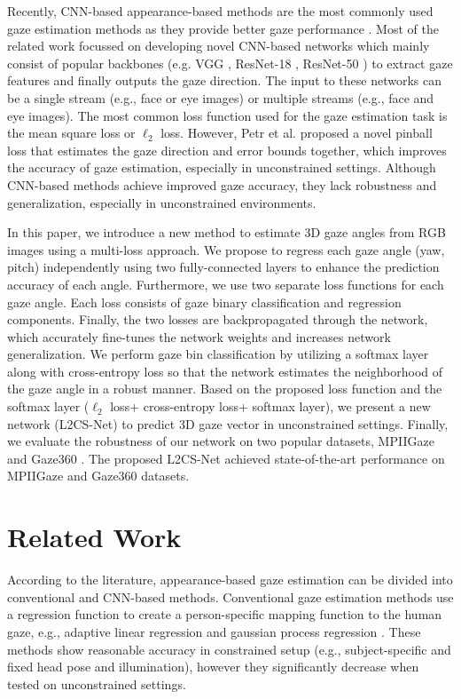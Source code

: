 \documentclass{article}
\begin{document}
Recently, CNN-based appearance-based methods are the most commonly used gaze estimation methods as they provide better gaze performance \cite{cvpr2021,ca-net, dilated,liu2020gaze}. Most of the related work \cite{Gaze360,Mpiigaze,cvpr2021,dilated,ca-net} focussed on developing novel CNN-based networks which mainly consist of popular backbones (e.g. VGG \cite{rtgene}, ResNet-18 \cite{Gaze360}, ResNet-50 \cite{Ethxgaze}) to extract gaze features and finally outputs the gaze direction. The input to these networks can be a single stream \cite{Ethxgaze, Gaze360}(e.g., face or eye images) or multiple streams \cite{cvpr2021} (e.g., face and eye images). The most common loss function used for the gaze estimation task is the mean square loss or $\ell_2$ loss. However, Petr et al. \cite{Gaze360} proposed a novel pinball loss that estimates the gaze direction and error bounds together, which improves the accuracy of gaze estimation, especially in unconstrained settings. Although CNN-based methods achieve improved gaze accuracy, they lack robustness and generalization, especially in unconstrained environments.

In this paper, we introduce a new method to estimate 3D gaze angles from RGB images using a multi-loss approach. We propose to regress each gaze angle (yaw, pitch) independently using two fully-connected layers to enhance the prediction accuracy of each angle. Furthermore, we use two separate loss functions for each gaze angle. Each loss consists of gaze binary classification and regression components. Finally, the two losses are backpropagated through the network, which accurately fine-tunes the network weights and increases network generalization. We perform gaze bin classification by utilizing a softmax layer along with cross-entropy loss so that the network estimates the neighborhood of the gaze angle in a robust manner. Based on the proposed loss function and the softmax layer ($\ell_2$ loss+ cross-entropy loss+ softmax layer), we present a new network (L2CS-Net) to predict 3D gaze vector in unconstrained settings. Finally, we evaluate the robustness of our network on two popular datasets, MPIIGaze \cite{Mpiigaze} and Gaze360 \cite{Gaze360}. The proposed L2CS-Net achieved state-of-the-art performance on MPIIGaze and Gaze360 datasets.



\section{Related Work}
\label{sec:relatedwork}
According to the literature, appearance-based gaze estimation can be divided into conventional and CNN-based methods. Conventional gaze estimation methods use a regression function to create a person-specific mapping function to the human gaze, e.g., adaptive linear regression \cite{lu2014adaptive} and gaussian process regression \cite{williams2006sparse}. These methods show reasonable accuracy in constrained setup (e.g., subject-specific and fixed head pose and illumination), however they significantly decrease when tested on unconstrained settings. 
\end{document}
